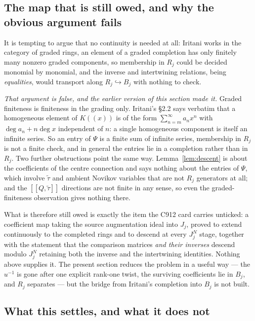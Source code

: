 \documentclass[11pt]{article}
\theoremstyle{definition}
\theoremstyle{remark}
\begin{document}
\subsection*{The map that is still owed, and why the obvious argument fails}

It is tempting to argue that no continuity is needed at all: Iritani works in the
category of graded rings, an element of a graded completion has only finitely many
nonzero graded components, so membership in $R_j$ could be decided monomial by
monomial, and the inverse and intertwining relations, being \emph{equalities},
would transport along $R_j\hookrightarrow B_j$ with nothing to check.

\emph{That argument is false, and the earlier version of this section made it.}
Graded finiteness is finiteness in the grading only. Iritani's \S2.2 says
verbatim that a homogeneous element of $K(\!(x)\!)$ is of the form
$\sum_{n=m}^\infty a_nx^n$ with $\deg a_n+n\deg x$ independent of $n$: a single
homogeneous component is itself an infinite series. So an entry of $\Psi$ is a
finite sum of infinite series, membership in $R_j$ is not a finite check, and in
general the entries lie in a completion rather than in $R_j$. Two further
obstructions point the same way. Lemma~\ref{lem:descent} is about the coefficients
of the centre connection and says nothing about the entries of $\Psi$, which
involve $\widetilde\tau$ and ambient Novikov variables that are not $R_j$
generators at all; and the $[[Q,\widetilde\tau]]$ directions are not finite in any
sense, so even the graded-finiteness observation gives nothing there.

What is therefore still owed is exactly the item the C912 card carries unticked:
a coefficient map taking the source augmentation ideal into $J_j$, proved to
extend continuously to the completed rings and to descend at every $J_j^N$ stage,
together with the statement that the comparison matrices \emph{and their inverses}
descend modulo $J_j^N$ retaining both the inverse and the intertwining identities.
Nothing above supplies it. The present section reduces the problem in a useful way
--- the $u^{-1}$ is gone after one explicit rank-one twist, the surviving
coefficients lie in $B_j$, and $R_j$ separates --- but the bridge from Iritani's
completion into $B_j$ is not built.

\subsection*{What this settles, and what it does not}
\end{document}
